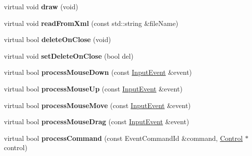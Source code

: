 \begin{DoxyCompactItemize}
\item 
virtual void {\bfseries draw} (void)\hypertarget{classWindow_a9e00af8f33ece8170bdd0b7c655dea9b}{}\label{classWindow_a9e00af8f33ece8170bdd0b7c655dea9b}

\item 
virtual void {\bfseries read\+From\+Xml} (const std\+::string \&file\+Name)\hypertarget{classWindow_adbc53cf0f013bf8d7158ef605bb20976}{}\label{classWindow_adbc53cf0f013bf8d7158ef605bb20976}

\item 
virtual bool {\bfseries delete\+On\+Close} (void)\hypertarget{classWindow_a55ec58e91ed784ad69512eee450a22ce}{}\label{classWindow_a55ec58e91ed784ad69512eee450a22ce}

\item 
virtual void {\bfseries set\+Delete\+On\+Close} (bool del)\hypertarget{classWindow_a686a987325b86f639a7429da23f8eb0b}{}\label{classWindow_a686a987325b86f639a7429da23f8eb0b}

\item 
virtual bool {\bfseries process\+Mouse\+Down} (const \hyperlink{structInputEvent}{Input\+Event} \&event)\hypertarget{classWindow_ade55e114bbc03c5eb6dddbb94151531a}{}\label{classWindow_ade55e114bbc03c5eb6dddbb94151531a}

\item 
virtual bool {\bfseries process\+Mouse\+Up} (const \hyperlink{structInputEvent}{Input\+Event} \&event)\hypertarget{classWindow_a4485f7f6555a9950ccc5d44389ce24a4}{}\label{classWindow_a4485f7f6555a9950ccc5d44389ce24a4}

\item 
virtual bool {\bfseries process\+Mouse\+Move} (const \hyperlink{structInputEvent}{Input\+Event} \&event)\hypertarget{classWindow_adba3665cc5e970b86c1999f07bc9bf17}{}\label{classWindow_adba3665cc5e970b86c1999f07bc9bf17}

\item 
virtual bool {\bfseries process\+Mouse\+Drag} (const \hyperlink{structInputEvent}{Input\+Event} \&event)\hypertarget{classWindow_a988ee9af09606de20b7c4560a343bb75}{}\label{classWindow_a988ee9af09606de20b7c4560a343bb75}

\item 
virtual bool {\bfseries process\+Command} (const Event\+Command\+Id \&command, \hyperlink{classControl}{Control} $\ast$control)\hypertarget{classWindow_a2e57308a931e1847c2999caf7ac1af57}{}\label{classWindow_a2e57308a931e1847c2999caf7ac1af57}

\end{DoxyCompactItemize}

